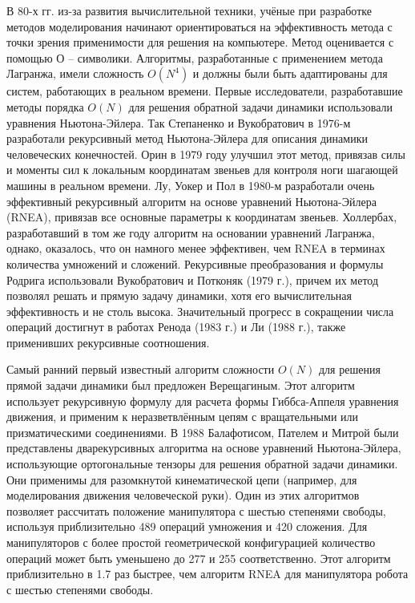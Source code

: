 {	В 80-х гг. из-за развития вычислительной техники, учёные при разработке методов моделирования начинают ориентироваться на эффективность метода с точки зрения применимости для решения на компьютере.  Метод оценивается с помощью О – символики. Алгоритмы, разработанные с применением метода Лагранжа, имели сложность $O(N^4)$ и должны были быть адаптированы для систем, работающих в реальном времени. Первые исследователи, разработавшие методы порядка $O(N)$ для решения обратной задачи динамики использовали уравнения Ньютона-Эйлера. Так Степаненко и Вукобратович в 1976-м разработали рекурсивный метод Ньютона-Эйлера для описания динамики человеческих конечностей. Орин в 1979 году улучшил этот метод, привязав силы и моменты сил к локальным координатам звеньев для контроля ноги шагающей машины в реальном времени. Лу, Уокер и Пол в 1980-м разработали очень эффективный рекурсивный алгоритм на основе уравнений Ньютона-Эйлера (RNEA), привязав все основные параметры к координатам звеньев. Холлербах, разработавший в том же году алгоритм на основании уравнений Лагранжа, однако, оказалось, что он намного менее эффективен, чем RNEA в терминах количества умножений и сложений. Рекурсивные преобразования и формулы Родрига использовали Вукобратович и Потконяк \cite{vukobratovic79} (1979 г.), причем их метод позволял решать и прямую задачу динамики, хотя его вычислительная эффективность и не столь высока. Значительный прогресс в сокращении числа операций достигнут в работах Ренода \cite{mahil82} (1983 г.) и Ли \cite{halfman72} (1988 г.), также применивших рекурсивные соотношения.\cite{belousov02}
	
	Самый ранний первый известный алгоритм сложности $O(N)$ для решения прямой задачи динамики был предложен Верещагиным. Этот алгоритм использует рекурсивную формулу для расчета формы Гиббса-Аппеля уравнения движения, и применим к неразветвлённым цепям с вращательными или призматическими соединениями. 
	В 1988 Балафотисом, Пателем и Митрой были представлены дварекурсивных алгоритма на основе уравнений Ньютона-Эйлера, использующие ортогональные тензоры для решения обратной задачи динамики. Они применимы для разомкнутой кинематической цепи (например, для моделирования движения человеческой руки). Один из этих алгоритмов позволяет рассчитать положение манипулятора с шестью степенями свободы, используя приблизительно 489 операций умножения и 420 сложения. Для манипуляторов с более простой геометрической конфигурацией количество операций может быть уменьшено до 277 и 255 соответственно. \cite{balafoutis} Этот алгоритм приблизительно в 1.7 раз быстрее, чем алгоритм RNEA для манипулятора робота с шестью степенями свободы.
	
}
